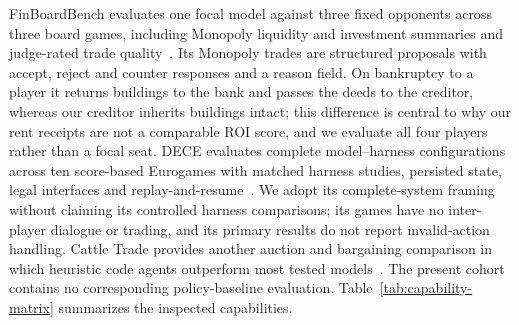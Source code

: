 FinBoardBench evaluates one focal model against three fixed opponents across three board games, including Monopoly liquidity and investment summaries and judge-rated trade quality~\cite{hu2026finboardbench}. Its Monopoly trades are structured proposals with accept, reject and counter responses and a reason field. On bankruptcy to a player it returns buildings to the bank and passes the deeds to the creditor, whereas our creditor inherits buildings intact; this difference is central to why our rent receipts are not a comparable ROI score, and we evaluate all four players rather than a focal seat. DECE evaluates complete model--harness configurations across ten score-based Eurogames with matched harness studies, persisted state, legal interfaces and replay-and-resume~\cite{zhang2026dece}. We adopt its complete-system framing without claiming its controlled harness comparisons; its games have no inter-player dialogue or trading, and its primary results do not report invalid-action handling. Cattle Trade provides another auction and bargaining comparison in which heuristic code agents outperform most tested models~\cite{muller2026cattletrade}. The present cohort contains no corresponding policy-baseline evaluation. Table~\ref{tab:capability-matrix} summarizes the inspected capabilities.

